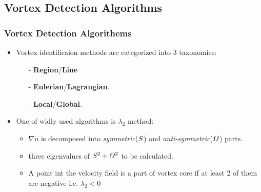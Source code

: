 \documentclass[aspectratio=169]{beamer}
\begin{document}
\subsection{Vortex Detection Algorithms}
\begin{frame}
  \frametitle{Vortex Detection Algorithems}
  \begin{itemize}
  \item Vortex identificaion methods are categorized into 3 taxonomies:
    \begin{itemize}
      \item[-] \textbf{Region}/\textbf{Line}
      \item[-] \textbf{Eulerian}/\textbf{Lagrangian}.
      \item[-] \textbf{Local}/\textbf{Global}.
    \end{itemize}
    \item One of widly used algorithms is $\lambda_{2}$ method:
    \begin{itemize}
      \item  $\nabla \overline{u}$ is decomposed into \textit{symmetric}($\mathnormal{S}$) and \textit{anti-symmetric}($\mathnormal{\Omega}$) parts.
      \item three eigenvalues of $\mathnormal{S}^2+\mathnormal{\Omega}^2$ to be calculated.
      \item A point int the velocity field is a part of vortex core if at least 2 of them are negative i.e. $\lambda_{2}<0$
    \end{itemize}
  \end{itemize}     
  
\end{frame}

\end{document}
